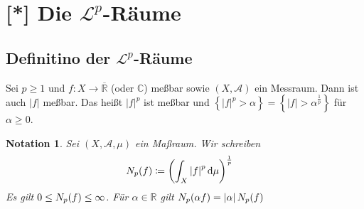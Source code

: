 \documentclass[11pt, twoside, a4paper]{article}
\theoremstyle{plain}
\newtheorem{notation}[blockelement]{Notation}
\numberwithin{equation}{subsection}
\newcommand{\set}[1]{\left\{#1\right\}}
\newcommand{\pair}[1]{\left(#1\right)}
\newcommand{\of}[1]{\mathopen{}\mathclose{}\bgroup\left(#1\aftergroup\egroup\right)}
\newcommand{\abs}[1]{\left\lvert#1\right\rvert}
\newcommand{\dif}{\mathop{}\!\mathrm{d}}
\newcommand{\R}{\mathbb{R}}
\newcommand{\C}{\mathbb{C}}
\newcommand{\mA}{\mathcal{A}}
\newcommand{\mL}{\mathcal{L}}
\begin{document}
    \newpage


    \section{[*] Die $\mL^{p}$-Räume}

    \subsection{Definitino der $\mL^{p}$-Räume}
    \thispagestyle{pagenumberonly}
    Sei $p\geq 1$ und $f: X \to\overline{\R}$ (oder $\C$) meßbar sowie $\pair{X, \mA}$ ein Messraum. Dann ist auch $\abs{f}$ meßbar. Das heißt $\abs{f}^p$ ist meßbar und $\set{\abs{f}^p > \alpha} = \set{\abs{f} > \alpha^{\frac{1}{p}}}$ für $\alpha \geq 0$.

    \begin{notation}
        Sei $\pair{X, \mA, \mu}$ ein Maßraum. Wir schreiben
        \begin{align*}
            N_p\of{f} &\coloneqq \pair{ \int_{X}^{} \abs{f}^p \dif \mu}^{\frac{1}{p}}
        \end{align*}
        Es gilt $0\leq N_p\of{f} \leq \infty$. Für $\alpha\in\R$ gilt $N_p\of{\alpha f} = \abs{\alpha} N_p\of{f}$
    \end{notation}
\end{document}

